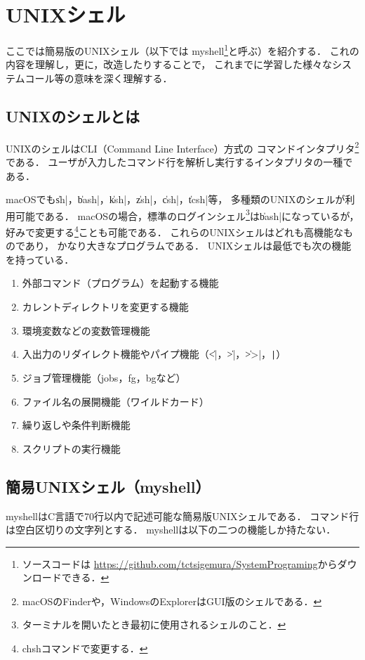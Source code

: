 \chapter{UNIXシェル}
ここでは簡易版のUNIXシェル（以下では myshell\footnote{
ソースコードは
\url{https://github.com/tctsigemura/SystemPrograming}からダウンロードできる．
}と呼ぶ）を紹介する．
これの内容を理解し，更に，改造したりすることで，
これまでに学習した様々なシステムコール等の意味を深く理解する．

\section{UNIXのシェルとは}
UNIXのシェルはCLI（Command Line Interface）方式の
コマンドインタプリタ\footnote{
macOSのFinderや，WindowsのExplorerはGUI版のシェルである．}である．
ユーザが入力したコマンド行を解析し実行するインタプリタの一種である．

macOSでも\|sh|，\|bash|，\|ksh|，\|zsh|，\|csh|，\|tcsh|等，
多種類のUNIXのシェルが利用可能である．
macOSの場合，標準のログインシェル\footnote{
ターミナルを開いたとき最初に使用されるシェルのこと．
}は\|bash|になっているが，好みで変更する\footnote{
chshコマンドで変更する．}ことも可能である．
これらのUNIXシェルはどれも高機能なものであり，
かなり大きなプログラムである．
UNIXシェルは最低でも次の機能を持っている．

\begin{enumerate}
\item 外部コマンド（プログラム）を起動する機能
\item カレントディレクトリを変更する機能
\item 環境変数などの変数管理機能
\item 入出力のリダイレクト機能やパイプ機能（\|<|，\|>|，\|>>|，\verb;|;）
\item ジョブ管理機能（jobs，fg，bgなど）
\item ファイル名の展開機能（ワイルドカード）
\item 繰り返しや条件判断機能
\item スクリプトの実行機能
\end{enumerate}

\section{簡易UNIXシェル（myshell）}
myshellはC言語で70行以内で記述可能な簡易版UNIXシェルである．
コマンド行は空白区切りの文字列とする．
myshellは以下の二つの機能しか持たない．

